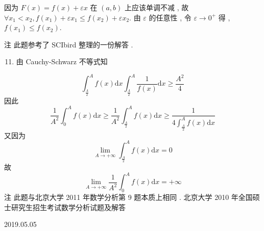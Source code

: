 \documentclass[10pt]{article}
\begin{document}
 因为  $F(x)=f(x)+\varepsilon x$  在  $(a, b)$  上应该单调不减 ,  故  $\forall x_{1}<x_{2}, f\left(x_{1}\right)+\varepsilon x_{1} \leqslant f\left(x_{2}\right)+\varepsilon x_{2}$.  由  $\varepsilon$  的任意性 ,  令  $\varepsilon \rightarrow 0^{+}$ 得 , $f\left(x_{1}\right) \leqslant f\left(x_{2}\right)$.

 注   此题参考了  SCIbird  整理的一份解答 .

\begin{enumerate}
  \setcounter{enumi}{10}
  \item  由  Cauchy-Schwarz  不等式知 
\end{enumerate}
$$
\int_{\frac{A}{2}}^{A} f(x) \mathrm{d} x \int_{\frac{A}{2}}^{A} \frac{1}{f(x)} \mathrm{d} x \geqslant \frac{A^{2}}{4}
$$
 因此 
$$
\frac{1}{A^{2}} \int_{0}^{A} f(x) \mathrm{d} x \geqslant \frac{1}{A^{2}} \int_{\frac{A}{2}}^{A} f(x) \mathrm{d} x \geqslant \frac{1}{4 \int_{\frac{A}{2}}^{A} f(x) \mathrm{d} x}
$$
 又因为 
$$
\lim _{A \rightarrow+\infty} \int_{\frac{A}{2}}^{A} f(x) \mathrm{d} x=0
$$
 故 
$$
\lim _{A \rightarrow+\infty} \frac{1}{A^{2}} \int_{0}^{A} f(x) \mathrm{d} x=+\infty
$$
 注   此题与北京大学  2011  年数学分析第  9  题本质上相同 .  北京大学  2010  年全国硕士研究生招生考试数学分析试题及解答 

   

2019.05.05
\end{document}
